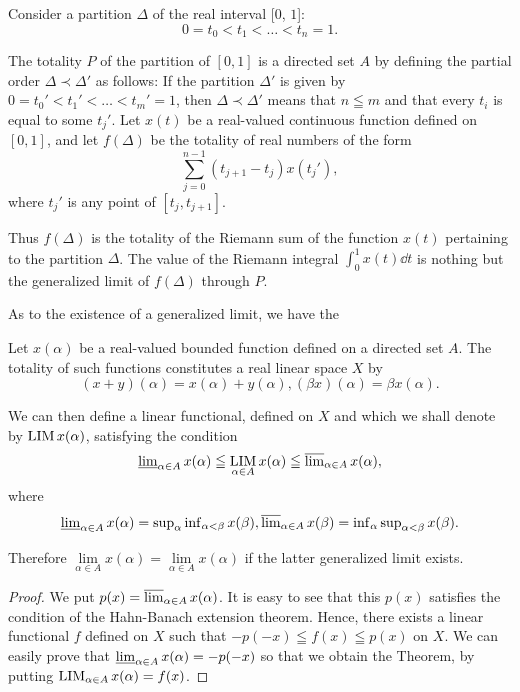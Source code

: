 \begin{examplen} Consider a partition $\Delta$ of the real interval [$0$, $1$]:
\[
0 = t _{0} < t _{1} < \dots < t _{n} = 1.
\]

The totality $P$ of the partition of $[0,1]$ is a directed set $A$ by defining the partial order $\Delta \prec \Delta'$ as follows: If the partition $\Delta'$ is given by $0 = t_0' < t_1' < \dots < t_m' = 1$, then $\Delta \prec \Delta'$ means that $n \leqq m$ and that every $t_i$ is equal to some $t_j'$. Let $x(t)$ be a real-valued continuous function defined on $[0,1]$, and let $f(\Delta)$ be the totality of real numbers of the form 
\[
\sum_{j=0}^{n-1}(t_{j+1}-t_j)x(t_j'),
\]
where $t_j'$ is any point of $[t_j,t_{j+1}]$.

Thus $f(\Delta)$ is the totality of the Riemann sum of the function $x(t)$ pertaining to the partition $\Delta$. The value of the Riemann integral $\int_{0}^{1} x(t) \dd t$ is nothing but the generalized limit of $f(\Delta)$ through $P$. 

As to the existence of a generalized limit, we have the 

\end{examplen}
\begin{theoremn} Let $x(\alpha)$ be a real-valued bounded function defined on a directed set $A$. The totality of such functions constitutes a real linear space $X$ by
\[
(x + y) (\alpha) = x (\alpha) + y (\alpha), (\beta x) (\alpha) = \beta x (\alpha).
\]

We can then define a linear functional, defined on $X$ and which we shall denote by $\LIM x(\alpha)$, satisfying the condition 
\[
\varliminf\limits_{\alpha \in A} x (\alpha) \leqq \operatorname * {L I M} _{\alpha \in A} x (\alpha) \leqq \varlimsup\limits_{\alpha \in A} x (\alpha),
\]
where 
\[
\varliminf\limits_{\alpha \in A} x (\alpha) = \sup\limits _{\alpha} \inf\limits _{\alpha < \beta} x (\beta), \varlimsup\limits_{\alpha \in A} x (\beta) = \inf\limits _{\alpha} \sup\limits _{\alpha < \beta} x (\beta).
\]

Therefore $\lim\limits_{\alpha \in A}x(\alpha) = \lim\limits_{\alpha \in A}x(\alpha)$ if the latter generalized limit exists. 

\end{theoremn}
\begin{proof}
 We put $p(x) = \varlimsup\limits_{\alpha \in A} x(\alpha)$. It is easy to see that this $p(x)$ satisfies the condition of the Hahn-Banach extension theorem. Hence, there exists a linear functional $f$ defined on $X$ such that $-p(-x) \leqq f(x) \leqq p(x)$ on $X$. We can easily prove that $\varliminf\limits_{\alpha \in A} x(\alpha) = -p(-x)$ so that we obtain the Theorem, by putting $\LIM_{\alpha \in A} x(\alpha) = f(x)$. 
\end{proof}


